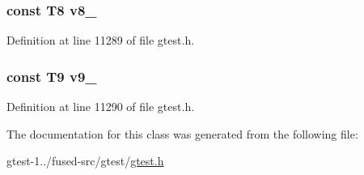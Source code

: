 \hypertarget{classtesting_1_1internal_1_1ValueArray21_a596bc5260b2474271d1f6910ff6f665d}{
\subsubsection[{v8\-\_\-}]{\setlength{\rightskip}{0pt plus 5cm}const \-T8 {\bf v8\-\_\-}}}\label{d6/db9/classtesting_1_1internal_1_1ValueArray21_a596bc5260b2474271d1f6910ff6f665d}


\-Definition at line 11289 of file gtest.\-h.

\hypertarget{classtesting_1_1internal_1_1ValueArray21_a6356e16cf54a9dfac8525f20242af31e}{
\subsubsection[{v9\-\_\-}]{\setlength{\rightskip}{0pt plus 5cm}const \-T9 {\bf v9\-\_\-}}}\label{d6/db9/classtesting_1_1internal_1_1ValueArray21_a6356e16cf54a9dfac8525f20242af31e}


\-Definition at line 11290 of file gtest.\-h.



\-The documentation for this class was generated from the following file\-:\begin{DoxyCompactItemize}
\item 
gtest-\/1../fused-\/src/gtest/\hyperlink{fused-src_2gtest_2gtest_8h}{gtest.\-h}\end{DoxyCompactItemize}
